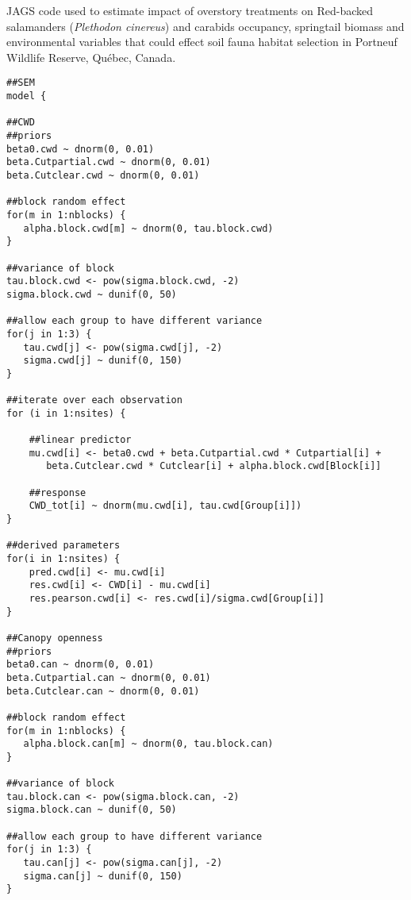 \begin{table}[ht!]
\caption[JAGS code used to estimate impact of overstory treatments on Red-backed salamanders (\textit{Plethodon cinereus}) and carabids occupancy, springtail biomass and environmental variables that could effect soil fauna habitat selection.]
    {JAGS code used to estimate impact of overstory treatments on Red-backed salamanders (\textit{Plethodon cinereus}) and carabids occupancy, springtail biomass and environmental variables that could effect soil fauna habitat selection in Portneuf Wildlife Reserve, Québec, Canada.}
    \label{ann:SEM_script}
\end{table}
\begin{lstlisting}
##SEM
model {

##CWD
##priors
beta0.cwd ~ dnorm(0, 0.01)
beta.Cutpartial.cwd ~ dnorm(0, 0.01)
beta.Cutclear.cwd ~ dnorm(0, 0.01)

##block random effect
for(m in 1:nblocks) {
   alpha.block.cwd[m] ~ dnorm(0, tau.block.cwd)
}

##variance of block
tau.block.cwd <- pow(sigma.block.cwd, -2)
sigma.block.cwd ~ dunif(0, 50)

##allow each group to have different variance
for(j in 1:3) {
   tau.cwd[j] <- pow(sigma.cwd[j], -2)
   sigma.cwd[j] ~ dunif(0, 150)
}

##iterate over each observation
for (i in 1:nsites) {

    ##linear predictor  
    mu.cwd[i] <- beta0.cwd + beta.Cutpartial.cwd * Cutpartial[i] + 
       beta.Cutclear.cwd * Cutclear[i] + alpha.block.cwd[Block[i]]

    ##response
    CWD_tot[i] ~ dnorm(mu.cwd[i], tau.cwd[Group[i]])
}

##derived parameters
for(i in 1:nsites) {
    pred.cwd[i] <- mu.cwd[i]
    res.cwd[i] <- CWD[i] - mu.cwd[i]
    res.pearson.cwd[i] <- res.cwd[i]/sigma.cwd[Group[i]]
}

##Canopy openness
##priors
beta0.can ~ dnorm(0, 0.01)
beta.Cutpartial.can ~ dnorm(0, 0.01)
beta.Cutclear.can ~ dnorm(0, 0.01)

##block random effect
for(m in 1:nblocks) {
   alpha.block.can[m] ~ dnorm(0, tau.block.can)
}

##variance of block
tau.block.can <- pow(sigma.block.can, -2)
sigma.block.can ~ dunif(0, 50)

##allow each group to have different variance
for(j in 1:3) {
   tau.can[j] <- pow(sigma.can[j], -2)
   sigma.can[j] ~ dunif(0, 150)
}


\end{lstlisting}
